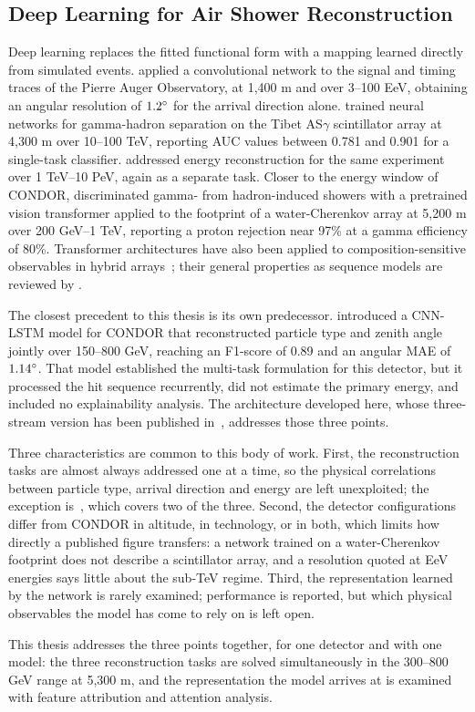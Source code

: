 \subsection{Deep Learning for Air Shower Reconstruction}

Deep learning replaces the fitted functional form with a mapping learned directly from simulated events.  applied a convolutional network to the signal and timing traces of the Pierre Auger Observatory, at 1,400 m and over 3--100 EeV, obtaining an angular resolution of $1.2\degree$ for the arrival direction alone.  trained neural networks for gamma-hadron separation on the Tibet AS$\gamma$ scintillator array at 4,300 m over 10--100 TeV, reporting AUC values between 0.781 and 0.901 for a single-task classifier.  addressed energy reconstruction for the same experiment over 1 TeV--10 PeV, again as a separate task. Closer to the energy window of CONDOR,  discriminated gamma- from hadron-induced showers with a pretrained vision transformer applied to the footprint of a water-Cherenkov array at 5,200 m over 200 GeV--1 TeV, reporting a proton rejection near 97\% at a gamma efficiency of 80\%. Transformer architectures have also been applied to composition-sensitive observables in hybrid arrays~; their general properties as sequence models are reviewed by .

The closest precedent to this thesis is its own predecessor.  introduced a CNN-LSTM model for CONDOR that reconstructed particle type and zenith angle jointly over 150--800 GeV, reaching an F1-score of 0.89 and an angular MAE of $1.14\degree$. That model established the multi-task formulation for this detector, but it processed the hit sequence recurrently, did not estimate the primary energy, and included no explainability analysis. The architecture developed here, whose three-stream version has been published in~, addresses those three points.

Three characteristics are common to this body of work. First, the reconstruction tasks are almost always addressed one at a time, so the physical correlations between particle type, arrival direction and energy are left unexploited; the exception is~, which covers two of the three. Second, the detector configurations differ from CONDOR in altitude, in technology, or in both, which limits how directly a published figure transfers: a network trained on a water-Cherenkov footprint does not describe a scintillator array, and a resolution quoted at EeV energies says little about the sub-TeV regime. Third, the representation learned by the network is rarely examined; performance is reported, but which physical observables the model has come to rely on is left open.

This thesis addresses the three points together, for one detector and with one model: the three reconstruction tasks are solved simultaneously in the 300--800 GeV range at 5,300 m, and the representation the model arrives at is examined with feature attribution and attention analysis.
